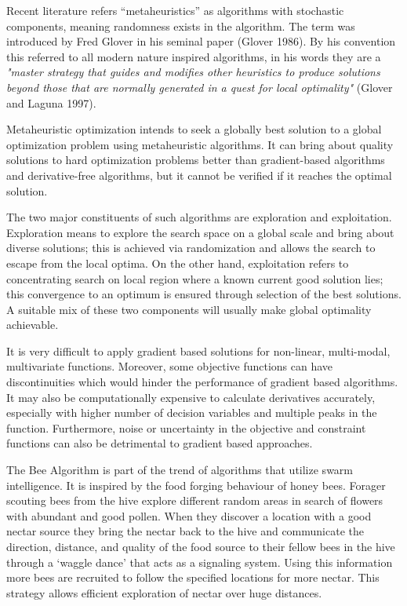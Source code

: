 \documentclass[12pt]{exam}
\begin{document}
\begin{questions}

\textbf{}

Recent literature refers “metaheuristics” as algorithms with stochastic components, meaning randomness exists in the algorithm. The term was introduced by Fred Glover in his seminal paper (Glover 1986). By his convention this referred to all modern nature inspired algorithms, in his words they are a \emph{"master strategy that guides and modifies other heuristics to produce solutions beyond those that are normally generated in a quest for local optimality"} (Glover and Laguna 1997). 

Metaheuristic optimization intends to seek a globally best solution to a global optimization problem using metaheuristic algorithms. It can bring about quality solutions to hard optimization problems better than gradient-based algorithms and derivative-free algorithms, but it cannot be verified if it reaches the optimal solution. 

The two major constituents of such algorithms are exploration and exploitation.  Exploration means to explore the search space on a global scale and bring about diverse solutions; this is achieved via randomization and allows the search to escape from the local optima. On the other hand, exploitation refers to concentrating search on local region where a known current good solution lies; this convergence to an optimum is ensured through selection of the best solutions. A suitable mix of these two components will usually make global optimality achievable.


\textbf{}

It is very difficult to apply gradient based solutions for non-linear, multi-modal, multivariate functions. Moreover, some objective functions can have discontinuities which would hinder the performance of gradient based algorithms. It may also be computationally expensive to calculate derivatives accurately, especially with higher number of decision variables and multiple peaks in the function. Furthermore, noise or uncertainty in the objective and constraint functions can also be detrimental to gradient based approaches. 

\textbf{}

The Bee Algorithm is part of the trend of algorithms that utilize swarm intelligence. It is inspired by the food forging behaviour of honey bees. Forager scouting bees from the hive explore different random areas in search of flowers with abundant and good pollen. When they discover a location with a good nectar source they bring the nectar back to the hive and communicate the direction, distance, and quality of the food source  to their fellow bees in the hive through a ‘waggle dance’ that acts as a signaling system. Using this information more bees are recruited to follow the specified locations for more nectar. This strategy allows efficient exploration of nectar over huge distances. 


\end{questions}
\end{document}

